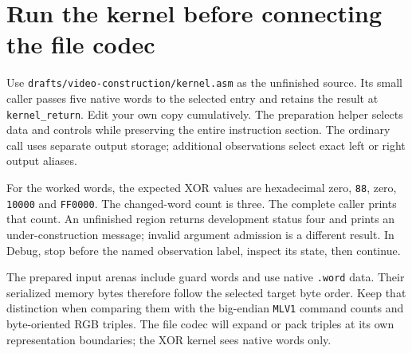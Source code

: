 \section{Run the kernel before connecting the file codec}
Use \texttt{drafts/video-construction/kernel.asm} as the unfinished source. Its small
caller passes five native words to the selected entry and retains the result at
\texttt{kernel\_return}. Edit your own copy cumulatively. The preparation helper
selects data and controls while preserving the entire instruction section.
The ordinary call uses separate output storage; additional observations select exact
left or right output aliases.

For the worked words, the expected XOR values are hexadecimal zero, \texttt{88},
zero, \texttt{10000} and \texttt{FF0000}. The changed-word count is three. The complete
caller prints that count. An unfinished region returns development status four and
prints an under-construction message; invalid argument admission is a different result.
In Debug, stop before the named observation label, inspect its state, then continue.

The prepared input arenas include guard words and use native \texttt{.word} data.
Their serialized memory bytes therefore follow the selected target byte order. Keep
that distinction when comparing them with the big-endian \texttt{MLV1} command counts
and byte-oriented RGB triples. The file codec will expand or pack triples at its own
representation boundaries; the XOR kernel sees native words only.

